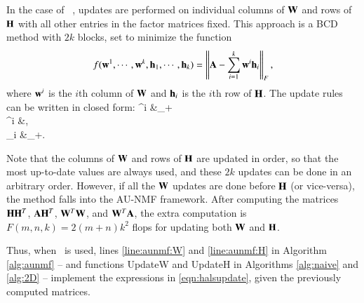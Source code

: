In the case of \HALS\ \cite{cichocki2009nonnegative,CA2009}, updates are performed on individual columns of $\mathbf{W}$ and rows of $\mathbf{H}$ with all other entries in the factor matrices fixed.
This approach is a BCD method with $2k$ blocks, set to minimize the function
\begin{equation}
f(\mathbf{w}^1,\cdots,\mathbf{w}^k,\mathbf{h}_1,\cdots,\mathbf{h}_k)=\left\|\mathbf{A}-\sum_{i=1}^k \mathbf{w}^i \mathbf{h}_i \right\|_F,\label{eq:hals_obj}
\end{equation}
where $\mathbf{w}^i$ is the $i$th column of $\mathbf{W}$ and $\mathbf{h}_i$ is the $i$th row of $\mathbf{H}$.
The update rules \cite[Algorithm 2]{CA2009} can be written in closed form:
\SplitN{\label{eqn:halsupdate}} {
\ww^i &\leftarrow \lt[ \ww^i + (\AA\HH^T)^i - \WW (\HH \HH^T)^i \rt]_+ \\
\ww^i &\leftarrow {},  \\
\hh_i &\leftarrow \lt[ \hh_i + (\WW^T\AA)_i - (\WW^T \WW)_i\HH \rt]_+.
} 

Note that the columns of $\mathbf{W}$ and rows of $\mathbf{H}$ are updated in order, so that the most up-to-date values are always used, and these $2k$ updates can be done in an arbitrary order.  However, if all the $\mathbf{W}$ updates are done before $\mathbf{H}$ (or vice-versa),  the method falls into the AU-NMF framework.
After computing the matrices $\mathbf{H}\mathbf{H}^T$, $\mathbf{A}\mathbf{H}^T$, $\mathbf{W}^T\mathbf{W}$, and $\mathbf{W}^T\mathbf{A}$, the extra computation is $F(m,n,k)=2(m+n)k^2$ flops for updating both $\mathbf{W}$ and $\mathbf{H}$. 

Thus, when \HALS\ is used, lines \ref{line:aunmf:W} and \ref{line:aunmf:H} in Algorithm \ref{alg:aunmf} -- and functions UpdateW and UpdateH in Algorithms \ref{alg:naive} and \ref{alg:2D} -- implement the expressions in \eqref{eqn:halsupdate}, given the previously computed matrices.  






